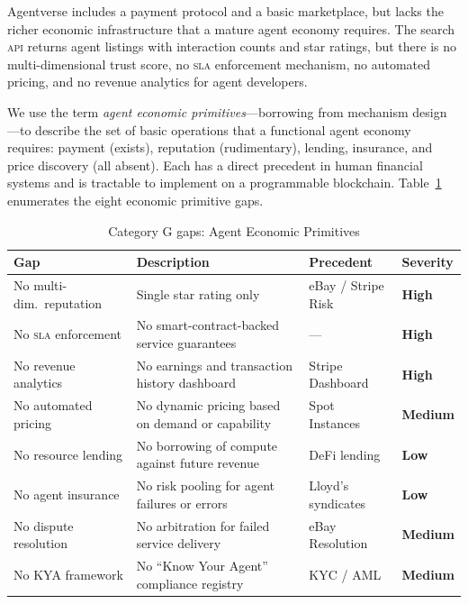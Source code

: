 \documentclass[twoside,11pt]{article}
\newcommand{\high}{\textcolor{red!70!black}{\textbf{High}}}
\newcommand{\medium}{\textcolor{orange!80!black}{\textbf{Medium}}}
\newcommand{\low}{\textcolor{green!50!black}{\textbf{Low}}}
\begin{document}
Agentverse includes a payment protocol and a basic marketplace, but lacks the
richer economic infrastructure that a mature agent economy requires.  The
search \textsc{api} returns agent listings with interaction counts and star
ratings, but there is no multi-dimensional trust score, no \textsc{sla}
enforcement mechanism, no automated pricing, and no revenue analytics for
agent developers.

We use the term \emph{agent economic primitives}---borrowing from mechanism
design \citep{myerson2007mechanism}---to describe the set of basic operations
that a functional agent economy requires: payment (exists), reputation
(rudimentary), lending, insurance, and price discovery (all absent).  Each has
a direct precedent in human financial systems and is tractable to implement on
a programmable blockchain.  Table~\ref{tab:gap-economy} enumerates the eight
economic primitive gaps.

\begin{table}[htbp]
\centering
\caption{Category G gaps: Agent Economic Primitives}
\label{tab:gap-economy}
\begin{tabular}{>{\raggedright\arraybackslash}p{3.2cm} >{\raggedright\arraybackslash}p{5.5cm} >{\raggedright\arraybackslash}p{2.9cm} l}
\toprule
\textbf{Gap} & \textbf{Description} & \textbf{Precedent} &
\textbf{Severity} \\
\midrule
No multi-dim.\ reputation & Single star rating only & eBay / Stripe Risk &
\high \\
No \textsc{sla} enforcement & No smart-contract-backed service guarantees & ---
& \high \\
No revenue analytics & No earnings and transaction history dashboard & Stripe
Dashboard & \high \\
No automated pricing & No dynamic pricing based on demand or capability & Spot
Instances & \medium \\
No resource lending & No borrowing of compute against future revenue & DeFi
lending & \low \\
No agent insurance & No risk pooling for agent failures or errors & Lloyd's
syndicates & \low \\
No dispute resolution & No arbitration for failed service delivery & eBay
Resolution & \medium \\
No KYA framework & No ``Know Your Agent'' compliance registry & KYC / AML &
\medium \\
\bottomrule
\end{tabular}
\end{table}
\end{document}

